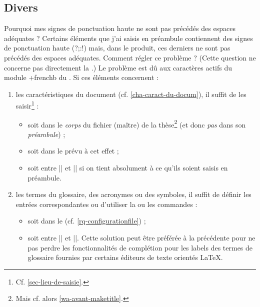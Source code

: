 \subsection{Divers}
\label{sec-divers}

\begin{dbfaq}{Pourquoi mes signes de ponctuation haute ne sont pas précédés des
    espaces adéquates ?}{}
  Certains éléments que j'ai saisis en préambule contiennent des signes de
  ponctuation haute ({\NoAutoSpacing?;:!}) mais, dans le \pdf{} produit, ces
  derniers ne sont pas précédés des espaces adéquates. Comment régler ce
  problème ?
  \tcblower
  (Cette question ne concerne pas directement la \yatCl{}.) Le problème est dû
  aux caractères actifs du module \package*+{frenchb} du . Si ces
  éléments concernent :
  \begin{enumerate}
  \item les caractéristiques du document (cf. \vref{cha-caract-du-docum}), il
    suffit de les saisir\footnote{Cf. \vref{sec-lieu-de-saisie}.} :
    \begin{itemize}
    \item soit dans le \emph{corps} du fichier (maître) de la
      thèse\footnote{Mais cf. alors \vref{wa-avant-maketitle}.} (et donc
      \emph{pas} dans son \emph{préambule}) ;
    \item soit dans le \File{\characteristicsfile} prévu à cet effet ;
    \item soit entre || et || si on tient
      absolument à ce qu'ils soient saisis en préambule.
    \end{itemize}
  \item les termes du glossaire, des acronymes ou des symboles, il suffit de
    définir les entrées correspondantes ou d'utiliser la ou les commandes
     :
    \begin{itemize}
    \item soit dans le \File{\configurationfile}
      (cf. \vref{rq-configurationfile}) ;
    \item soit entre || et ||. Cette
      solution peut être préférée à la précédente pour ne pas perdre les
      fonctionnalités de complétion pour les labels des termes de glossaire
      fournies par certains éditeurs de texte orientés \LaTeX{}.
    \end{itemize}
  \end{enumerate}
\end{dbfaq}

